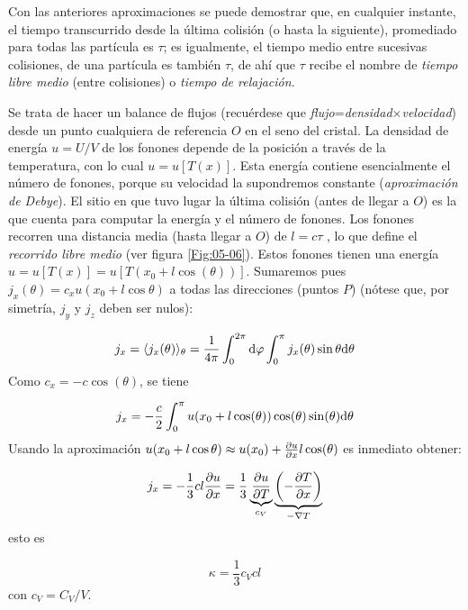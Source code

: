 Con las anteriores aproximaciones se puede demostrar que, en cualquier instante, el tiempo transcurrido desde la última colisión (o hasta la siguiente), promediado para todas las partícula es $\tau$; es igualmente, el tiempo medio entre sucesivas colisiones, de una partícula es también $\tau$, de ahí que $\tau$ recibe el nombre de \textit{tiempo libre medio} (entre colisiones) o \textit{tiempo de relajación}.  

Se trata de hacer un balance de flujos (recuérdese que \textit{flujo}=\textit{densidad}$\times$\textit{velocidad}) desde un punto cualquiera de referencia $O$ en el seno del cristal. La densidad de energía $u=U/V$ de los fonones depende de la posición a través de la temperatura, con lo cual $u=u[T(x)]$. Esta energía contiene esencialmente el número de fonones, porque su velocidad la supondremos constante (\textit{aproximación de Debye}). El sitio en que tuvo lugar la última colisión (antes de llegar a $O$) es la que cuenta para computar la energía y el número de fonones. Los fonones recorren una distancia media (hasta llegar a $O$) de $l=c \tau$ , lo que define el \textit{recorrido libre medio} (ver figura \ref{Fig:05-06}). Estos fonones tienen una energía $u=u[T(x)]=u[T(x_0+l\cos(\theta))]$. Sumaremos pues $j_x(\theta)=c_xu(x_0+l\cos \theta)$ a todas las direcciones (puntos $P$) (nótese que, por simetría, $j_y$ y $j_z$ deben ser nulos):

\begin{equation}
    j_x = \langle j_x(\theta) \rangle_{\theta} = \frac{1}{4\pi} \int_0^{2\pi} \mathrm{d} \varphi \int_0^\pi j_x (\theta) \sin \theta \mathrm{d} \theta 
\end{equation}
Como $c_x=-c\cos (\theta)$, se tiene

\begin{equation}
    j_x = - \frac{c}{2} \int_0^\pi u (x_0 + l \cos (\theta)) \cos (\theta) \sin (\theta) \mathrm{d} \theta
\end{equation}
Usando la aproximación $u(x_0+l\cos \theta) \approx u(x_0) + \frac{\partial u}{\partial x} l \cos(\theta)$ es inmediato obtener:

\begin{equation}
j_x = - \frac{1}{3} cl \frac{\partial u}{\partial x} = \frac{1}{3} \underbrace{\frac{\partial u}{\partial T}}_{c_V} \underbrace{\left( -\frac{\partial T}{\partial x} \right)}_{-\nabla T}
\end{equation}
esto es

\begin{equation}
    \kappa = \frac{1}{3} c_V cl
\end{equation}
con $c_V=C_V/V$.

